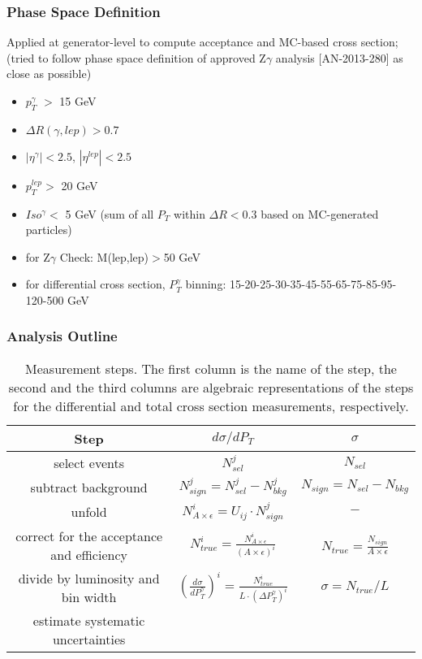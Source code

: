 \begin{frame}\frametitle{Phase Space Definition}
  \scriptsize
  Applied at generator-level to compute acceptance and MC-based cross section;\\
  (tried to follow phase space definition of approved Z$\gamma$ analysis [AN-2013-280] as close as possible)
  \begin{itemize}
  \item $p_T^{\gamma}$ $>$ 15 GeV
  \item $\Delta{R}(\gamma,lep) > 0.7$
  \item $|\eta^{\gamma}|<2.5$, $|\eta^{lep}|<2.5$
  \item $p_T^{lep}>$ 20 GeV
  \item $Iso^{\gamma}<$ 5 GeV (sum of all $P_T$ within $\Delta{R}<$0.3 based on MC-generated particles)
  \item for Z$\gamma$ Check: M(lep,lep)$>$50 GeV
  \item for differential cross section, $P_T^{\gamma}$ binning: 15-20-25-30-35-45-55-65-75-85-95-120-500 GeV
  \end{itemize}
\end{frame}%

\begin{frame}\frametitle{Analysis Outline}
\begin{table}[h]
  \small
  \begin{center}
  \caption{Measurement steps. The first column is the name of the step, the second and the third columns are algebraic representations of the steps for the differential and total cross section measurements, respectively. }
  \begin{tabular}{|c|c|c|}
    \hline
    Step & $d\sigma/dP_{T}$ & $\sigma$ \\ \hline
    select events & $N_{sel}^j$ &    $N_{sel}$       \\ \hline
    subtract background & $N_{sign}^j = N_{sel}^j - N_{bkg}^j$ &    $N_{sign}=N_{sel}-N_{bkg}$       \\ \hline
    unfold   & $N_{A\times\epsilon}^i = U_{ij} \cdot N_{sign}^j$ &    $-$       \\ \hline
    correct for the acceptance and efficiency & $N_{true}^i = \frac{N_{A\times\epsilon}^i}{(A \times\epsilon)^i}$ &  $N_{true}=\frac{N_{sign}}{A\times\epsilon}$       \\ \hline
    divide by luminosity and bin width & $ \left( \frac{d\sigma}{dP_{T}^\gamma} \right) ^i = \frac{N_{true}^i}{L \cdot (\Delta P_T^\gamma)^i}$  &  $\sigma = N_{true}/L$       \\ \hline
    estimate systematic uncertainties &  &         \\ \hline
  \end{tabular}
  \label{tab:analysisOutline}
  \end{center}
\end{table}
\end{frame}%
